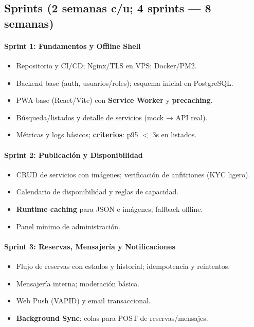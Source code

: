 \documentclass[12pt]{article}
\begin{document}
\subsection{Sprints (2 semanas c/u; 4 sprints — 8 semanas)}
\paragraph{Sprint 1: Fundamentos y Offline Shell}
\begin{itemize}[left=0pt, itemsep=2pt]
  \item Repositorio y CI/CD; Nginx/TLS en VPS; Docker/PM2.
  \item Backend base (auth, usuarios/roles); esquema inicial en PostgreSQL.
  \item PWA base (React/Vite) con \textbf{Service Worker} y \textbf{precaching}.
  \item Búsqueda/listados y detalle de servicios (mock → API real).
  \item Métricas y logs básicos; \textbf{criterios}: p95 $<$ 3s en listados.
\end{itemize}

\paragraph{Sprint 2: Publicación y Disponibilidad}
\begin{itemize}[left=0pt, itemsep=2pt]
  \item CRUD de servicios con imágenes; verificación de anfitriones (KYC ligero).
  \item Calendario de disponibilidad y reglas de capacidad.
  \item \textbf{Runtime caching} para JSON e imágenes; fallback offline.
  \item Panel mínimo de administración.
\end{itemize}

\paragraph{Sprint 3: Reservas, Mensajería y Notificaciones}
\begin{itemize}[left=0pt, itemsep=2pt]
  \item Flujo de reservas con estados y historial; idempotencia y reintentos.
  \item Mensajería interna; moderación básica.
  \item Web Push (VAPID) y email transaccional.
  \item \textbf{Background Sync}: colas para POST de reservas/mensajes.
\end{itemize}
\end{document}
